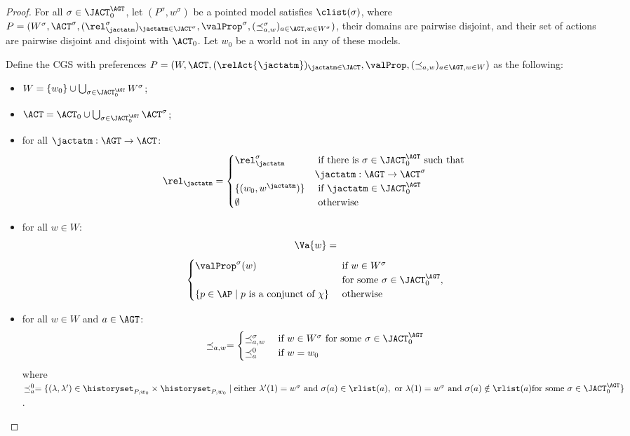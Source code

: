 \begin{proof}  
  For all $\sigma\in\JACT^{\AGT}_0$, let $(P^{\sigma }, w^{\sigma })$ be a pointed model satisfies $\clist(\sigma )$, where $P=(W^{\sigma }, \ACT^{\sigma }, (\rel^{\sigma}_{\jactatm} )_{\jactatm \in \JACT^{\sigma }},    \allowbreak \valProp^{\sigma }, (\preceq^{\sigma }_{a,w})_{a\in \AGT, w \in W^{\sigma } })$, their domains are pairwise disjoint, and their set of actions are pairwise disjoint and disjoint with $\ACT_0$. Let $w_0$ be a world not in any of these models.
  
  Define the CGS with preferences $P=( W, \ACT, (\relAct{\jactatm} )_{\jactatm \in \JACT},  \allowbreak \valProp , (\preceq_{a,w})_{a\in \AGT, w \in W })$ as the following:
  \begin{itemize}
    \item $W=\{w_0\}\cup \bigcup_{\sigma\in\JACT^{\AGT}_0}W^{\sigma }$;
    \item $\ACT=\ACT_0\cup \bigcup_{\sigma\in\JACT^{\AGT}_0}\ACT^{\sigma }$;
    \item for all $\jactatm: \AGT\to \ACT $:
    $$\rel_{\jactatm}=\begin{cases}
      \rel^{\sigma}_{\jactatm}&\text{ if there is }\sigma\in\JACT^{\AGT}_0 \text{ such that }\\
      &\jactatm: \AGT\to \ACT^{\sigma } \\
      \{(w_0,w^\jactatm)\}&\text{ if }\jactatm\in\JACT^{\AGT}_0 \\
      \emptyset &\text{ otherwise }
    \end{cases}$$
    \item for all $w \in W$:
    $$\Va{w}=$$
    $$\begin{cases}
      \valProp^{\sigma }(w)&\text{ if }w\in W^{\sigma } \\ & \text{ for some }\sigma\in\JACT^{\AGT}_0,\\
      \{p\in \AP \mid p \text{ is a conjunct of }\chi \}&\text{ otherwise }
    \end{cases}$$
    \item for all $w \in W$ and $a\in\AGT$:
    $$\preceq_{a,w}=\begin{cases}
        \preceq^{\sigma }_{a,w}&\text{ if }w\in W^{\sigma } \text{ for some }\sigma\in\JACT^{\AGT}_0\\
        \preceq^0_a&\text{ if }w=w_0
    \end{cases}$$
    where $\preceq^0_a=\{(\lambda,\lambda')\in \historyset_{P,w_0}\times \historyset_{P,w_0} \mid\text{either }\lambda'(1)=w^\sigma \text{ and }\sigma(a)\in \rlist(a), \text{ or }\lambda(1)=w^\sigma \text{ and }\sigma(a)\notin \rlist(a)\\ \text{for some }\sigma\in\JACT^{\AGT}_0\}$. 
  \end{itemize}


\end{proof}
